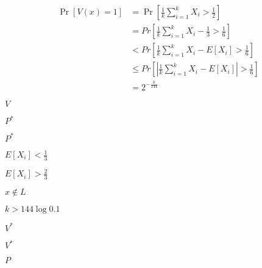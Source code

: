 \documentclass[10pt]{book}
\begin{document}
\begin{mdSnippets}
\begin{mdDisplaySnippet}[ae37f283c02c6da947d8b58945b522dd]
\[%
\begin{aligned}
\Pr[V(x) = 1] &= \Pr[\frac{1}{k}\sum_{i=1}^k X_i > \frac{1}{2}] \\
&= Pr[\frac{1}{k}\sum_{i=1}^k X_i - \frac{1}{3} > \frac{1}{6}] \\
&< Pr[\frac{1}{k}\sum_{i=1}^k X_i - E[X_i] > \frac{1}{6}] \\
&\leq Pr[|\frac{1}{k}\sum_{i=1}^k X_i - E[X_i]| > \frac{1}{6}] \\
&= 2^{-\frac{k}{144}} 
\end{aligned}
\]%
\end{mdDisplaySnippet}%
\begin{mdInlineSnippet}[5206560a306a2e085a437fd258eb57ce]%
$V$\end{mdInlineSnippet}%
\begin{mdInlineSnippet}%
$P^*$\end{mdInlineSnippet}%
\begin{mdInlineSnippet}%
$P^*$\end{mdInlineSnippet}%
\begin{mdInlineSnippet}%
$E[X_i] < \frac{1}{3}$\end{mdInlineSnippet}%
\begin{mdInlineSnippet}[542f5173336f732dc294a03d803e5f0a]%
$E[X_i] > \frac{2}{3}$\end{mdInlineSnippet}%
\begin{mdInlineSnippet}[8e681b85e2ea0786a5bcdc939df91b34]%
$x \notin L$\end{mdInlineSnippet}%
\begin{mdInlineSnippet}[02e008d857f8be8221994f20e160bdf6]%
$k > 144\log 0.1$\end{mdInlineSnippet}%
\begin{mdInlineSnippet}[3a9c678b7cfc2797473b3a5824cc17af]%
$V^*$\end{mdInlineSnippet}%
\begin{mdInlineSnippet}[3a9c678b7cfc2797473b3a5824cc17af]%
$V^*$\end{mdInlineSnippet}%
\begin{mdInlineSnippet}%
$P$\end{mdInlineSnippet}%

\end{mdSnippets}
\end{document}
